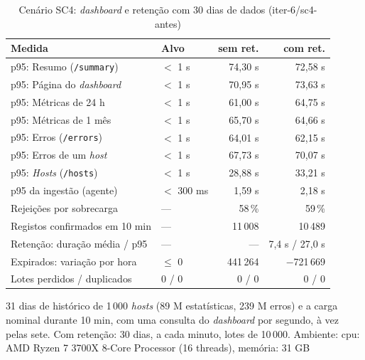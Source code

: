 \begin{table}[htbp]
  \centering\small
  \caption{Cenário SC4: \emph{dashboard} e retenção com 30 dias de dados (iter-6/sc4-antes)}
  \label{tab:carga-sc4}
  \begin{tabularx}{\linewidth}{>{\raggedright\arraybackslash}Xlrr}
    \toprule
    Medida & Alvo & sem ret. & com ret. \\
    \midrule
    p95: Resumo (\texttt{/summary}) & $<$ 1 s & 74,30 s & 72,58 s \\
    p95: Página do \emph{dashboard} & $<$ 1 s & 70,95 s & 73,63 s \\
    p95: Métricas de 24 h & $<$ 1 s & 61,00 s & 64,75 s \\
    p95: Métricas de 1 mês & $<$ 1 s & 65,70 s & 64,66 s \\
    p95: Erros (\texttt{/errors}) & $<$ 1 s & 64,01 s & 62,15 s \\
    p95: Erros de um \emph{host} & $<$ 1 s & 67,73 s & 70,07 s \\
    p95: \emph{Hosts} (\texttt{/hosts}) & $<$ 1 s & 28,88 s & 33,21 s \\
    p95 da ingestão (agente) & $<$ 300 ms & 1,59 s & 2,18 s \\
    Rejeições por sobrecarga & --- & 58\,\% & 59\,\% \\
    Registos confirmados em 10 min & --- & 11\,008 & 10\,489 \\
    Retenção: duração média / p95 & --- & --- & 7,4 s / 27,0 s \\
    Expirados: variação por hora & $\le$ 0 & 441\,264 & $-$721\,669 \\
    Lotes perdidos / duplicados & 0 / 0 & 0 / 0 & 0 / 0 \\
    \bottomrule
  \end{tabularx}
  \par\smallskip\footnotesize 31 dias de histórico de 1\,000 \emph{hosts} (89 M estatísticas, 239 M erros) e a carga nominal durante 10 min, com uma consulta do \emph{dashboard} por segundo, à vez pelas sete. Com retenção: 30 dias, a cada minuto, lotes de 10\,000. Ambiente: cpu: AMD Ryzen 7 3700X 8-Core Processor (16 threads), memória: 31 GB
\end{table}
